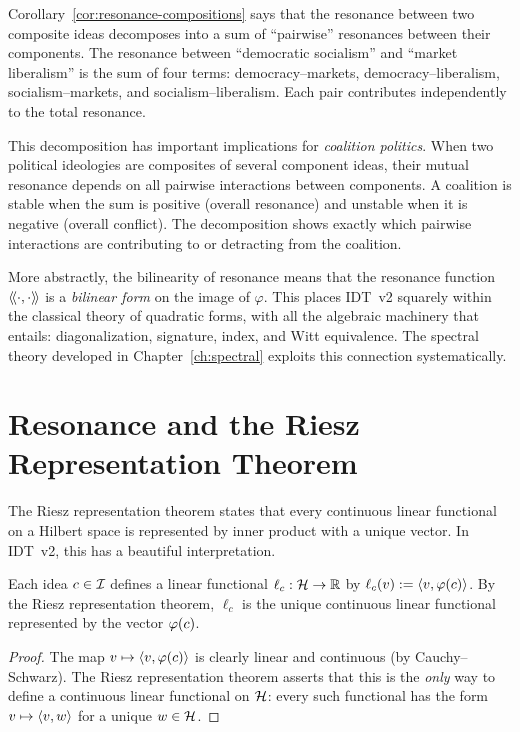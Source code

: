 \begin{interpretation}
\label{interp:decomposition}
Corollary~\ref{cor:resonance-compositions} says that the resonance between two
composite ideas decomposes into a sum of ``pairwise'' resonances between their
components. The resonance between ``democratic socialism'' and ``market
liberalism'' is the sum of four terms: democracy--markets, democracy--liberalism,
socialism--markets, and socialism--liberalism. Each pair contributes independently
to the total resonance.

This decomposition has important implications for \emph{coalition politics}.
When two political ideologies are composites of several component ideas, their
mutual resonance depends on all pairwise interactions between components. A
coalition is stable when the sum is positive (overall resonance) and unstable
when it is negative (overall conflict). The decomposition shows exactly which
pairwise interactions are contributing to or detracting from the coalition.

More abstractly, the bilinearity of resonance means that the resonance function
$\langle\!\langle \cdot, \cdot \rangle\!\rangle$ is a \emph{bilinear form} on the image of $\varphi$. This
places IDT~v2 squarely within the classical theory of quadratic forms, with all
the algebraic machinery that entails: diagonalization, signature, index, and
Witt equivalence. The spectral theory developed in Chapter~\ref{ch:spectral}
exploits this connection systematically.
\end{interpretation}


\section{Resonance and the Riesz Representation Theorem}

The Riesz representation theorem states that every continuous linear functional
on a Hilbert space is represented by inner product with a unique vector. In
IDT~v2, this has a beautiful interpretation.

\begin{proposition}
\label{prop:riesz}
Each idea $c \in \mathcal{I}$ defines a linear functional $\ell_c : \mathcal{H} \to
\mathbb{R}$ by $\ell_c(v) := \langle v, \varphi(c) \rangle$. By the Riesz representation
theorem, $\ell_c$ is the unique continuous linear functional represented by the
vector $\varphi(c)$.
\end{proposition}

\begin{proof}
The map $v \mapsto \langle v, \varphi(c) \rangle$ is clearly linear and continuous (by
Cauchy--Schwarz). The Riesz representation theorem asserts that this is the
\emph{only} way to define a continuous linear functional on $\mathcal{H}$: every
such functional has the form $v \mapsto \langle v, w \rangle$ for a unique $w \in \mathcal{H}$.
\end{proof}

